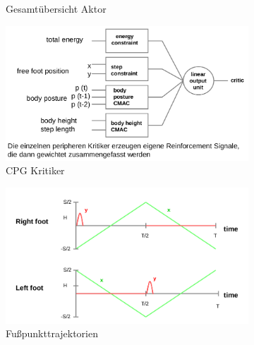 \begin{figure}
\begin{subfigure}{.5\textwidth}
		\caption{Gesamtübersicht Aktor}
		\label{ch:09:fig:gesamtuebersicht-aktor}
	\end{subfigure}
	\begin{subfigure}{.5\textwidth}
		\centering
		\includegraphics[width=\textwidth]{figures/cpg_kritiker.png}
		\caption{CPG Kritiker}
		\label{ch:09:fig:cpg-kritiker}
	\end{subfigure}
	\begin{subfigure}{.5\textwidth}
		\centering
		\includegraphics[width=\textwidth]{figures/fusspunkttrajektorien.png}
		\caption{Fußpunkttrajektorien}
		\label{ch:09:fig:fusspunkttrajektorien}
	\end{subfigure}
	\caption{}
\end{figure}


